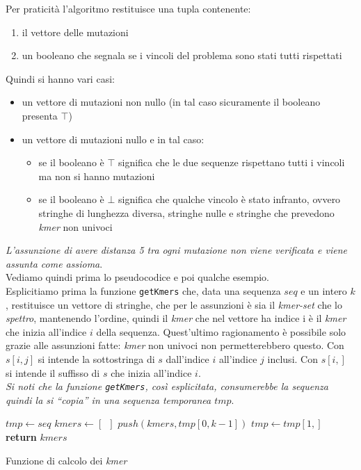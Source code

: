 \documentclass[a4paper,12pt, oneside]{book}
\begin{document}
Per praticità l'algoritmo restituisce una tupla contenente:
\begin{enumerate}
  \item il vettore delle mutazioni
  \item un booleano che segnala se i vincoli del problema sono stati tutti
  rispettati 
\end{enumerate}
Quindi si hanno vari casi:
\begin{itemize}
  \item un vettore di mutazioni non nullo (in tal caso sicuramente il booleano
  presenta $\top$)
  \item un vettore di mutazioni nullo e in tal caso:
  \begin{itemize}
    \item se il booleano è $\top$ significa che le due sequenze rispettano tutti
    i vincoli ma non si hanno mutazioni
    \item se il booleano è $\bot$ significa che qualche vincolo è stato
    infranto, ovvero stringhe di lunghezza diversa, stringhe nulle e stringhe
    che prevedono \textit{kmer} non univoci
  \end{itemize}
\end{itemize}
\textit{L'assunzione di avere distanza 5 tra ogni mutazione non viene verificata
  e viene assunta come assioma}.\\
Vediamo quindi prima lo pseudocodice e poi qualche esempio.\\
Esplicitiamo prima la funzione \texttt{getKmers} che, data una sequenza $seq$ e
un intero $k$, restituisce un vettore di stringhe, che per le assunzioni è sia
il \textit{kmer-set} che lo \textit{spettro}, mantenendo l'ordine, quindi il
\textit{kmer} che nel vettore ha indice i è il \textit{kmer} che inizia
all'indice $i$ della sequenza. Quest'ultimo ragionamento è possibile solo grazie
alle assunzioni fatte: \textit{kmer} non univoci non permetterebbero questo. Con
$s[i,j]$ si intende la sottostringa di $s$ dall'indice $i$ all'indice $j$
inclusi. Con $s[i,]$ si intende il suffisso di $s$ che inizia all'indice $i$.\\
\textit{Si noti che la funzione \texttt{getKmers}, così esplicitata,
  consumerebbe la sequenza 
  quindi la si ``copia'' in una sequenza temporanea $tmp$}.\\
\begin{algorithm}
  \small
  \begin{algorithmic}[1]
    \State $tmp\gets seq$
    \State $kmers \gets [\,\,\,]$
    \State $push(kmers, tmp[0,k-1])$
    \State $tmp \gets tmp[1,]$
    \EndWhile
    \State \textbf{return} $kmers$
    \EndFunction
  \end{algorithmic}
  \caption{Funzione di calcolo dei \textit{kmer}}
\end{algorithm}
\end{document}
